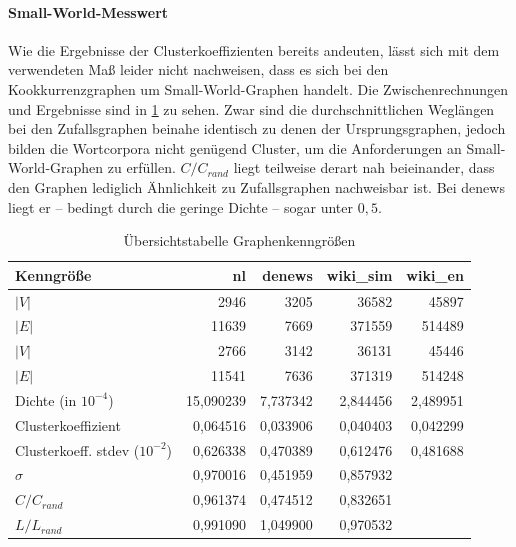 \documentclass[11pt, a4paper]{article}
\begin{document}
\paragraph{Small-World-Messwert}
Wie die Ergebnisse der Clusterkoeffizienten bereits andeuten, lässt sich mit dem verwendeten Maß leider nicht nachweisen, dass es sich bei den Kookkurrenzgraphen um Small-World-Graphen handelt.
Die Zwischenrechnungen und Ergebnisse sind in \ref{tab-zsf} zu sehen.
Zwar sind die durchschnittlichen Weglängen bei den Zufallsgraphen beinahe identisch zu denen der Ursprungsgraphen, jedoch bilden die Wortcorpora nicht genügend Cluster, um die Anforderungen an Small-World-Graphen zu erfüllen.
$C/C_{rand}$ liegt teilweise derart nah beieinander, dass den Graphen lediglich Ähnlichkeit zu Zufallsgraphen nachweisbar ist.
Bei denews liegt er -- bedingt durch die geringe Dichte -- sogar unter $0,5$.

\begin{table}[ht]
    \begin{tabular}{l*{4}{r}}
    \toprule
    Kenngröße                     & nl        & denews    & wiki\_sim & wiki\_en \\
    \midrule
    $|V|$                         & 2946      & 3205      & 36582     & 45897  \\
    $|E|$                         & 11639     & 7669      & 371559    & 514489 \\
    $|V|$\footnotemark[6]         & 2766      & 3142      & 36131     & 45446  \\
    $|E|$\footnotemark[6]         & 11541     & 7636      & 371319    & 514248 \\
    Dichte (in $10^{-4}$)         & 15,090239 & 7,737342  & 2,844456  & 2,489951 \\
    Clusterkoeffizient            & 0,064516  & 0,033906  & 0,040403  & 0,042299 \\
    Clusterkoeff. stdev ($10^{-2}$)           & 0,626338  & 0,470389  & 0,612476  & 0,481688 \\
    $\sigma$                      & 0,970016  & 0,451959  & 0,857932  &         \\
    $C / C_{rand}$                & 0,961374  & 0,474512  & 0,832651  &         \\
    $L / L_{rand}$                & 0,991090  & 1,049900  & 0,970532  &         \\
    \bottomrule
    \end{tabular}
    \caption{Übersichtstabelle Graphenkenngrößen}
    \label{tab-zsf}
\end{table}
\end{document}
